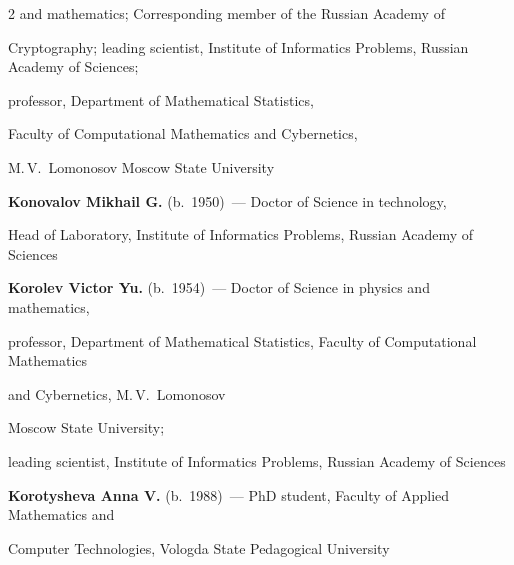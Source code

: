 \begin{multicols}{2}
and mathematics; Corresponding member of the Russian Academy of

Cryptography; leading scientist, Institute of Informatics Problems,  Russian Academy of Sciences;

professor, Department of Mathematical Statistics, 

Faculty of Computational Mathematics and Cybernetics, 

M.\,V.~Lomonosov Moscow State Univer\-sity



\vspace*{4pt}



\noindent

\textbf{Konovalov Mikhail G.} (b.\ 1950)~--- Doctor of Science in technology, 

Head of Laboratory, Institute of Informatics Problems,  Russian Academy of Sciences





\vspace*{4pt}





\noindent

\textbf{Korolev Victor Yu.} (b.\ 1954)~--- Doctor of Science in physics and mathematics, 

professor, Department of Mathematical Statistics, Faculty of Computational Mathematics 

and Cybernetics, M.\,V.~Lomonosov\linebreak\vspace*{-12pt}



\columnbreak



\noindent Moscow State University; 

leading scientist, Institute of Informatics Problems, Russian Academy of Sciences



\vspace*{4pt}



\noindent

\textbf{Korotysheva Anna V.} (b.\ 1988)~--- PhD student, Faculty of Applied Mathematics and

Computer Technologies, Vologda State Pedagogical University



\vspace*{4pt}




\end{multicols}
